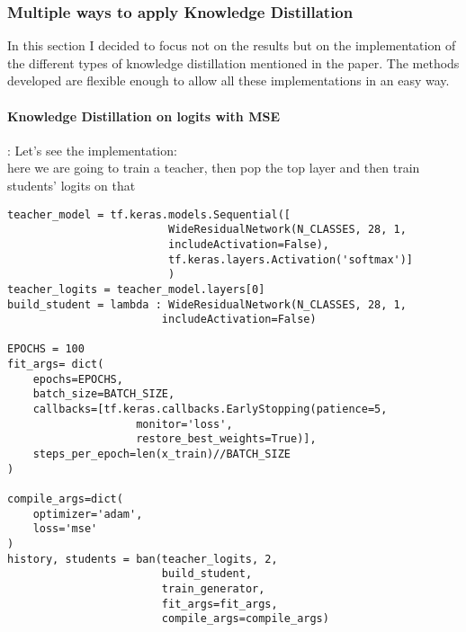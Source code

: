 \subsubsection{Multiple ways to apply Knowledge Distillation}
In this section I decided to focus not on the results but on the implementation of the different types of knowledge distillation mentioned in the paper\cite{kd}. The methods developed are flexible enough to allow all these implementations in an easy way.
\paragraph{Knowledge Distillation on logits with MSE}:
Let's see the implementation:\\
here we are going to train a teacher, then pop the top layer and then train students' logits on that
\lstset{language=Python}
\lstset{frame=lines}
\lstset{basicstyle=\footnotesize}
\begin{lstlisting}
teacher_model = tf.keras.models.Sequential([
                         WideResidualNetwork(N_CLASSES, 28, 1, 
                         includeActivation=False),
                         tf.keras.layers.Activation('softmax')]
                         )
teacher_logits = teacher_model.layers[0]
build_student = lambda : WideResidualNetwork(N_CLASSES, 28, 1, 
						includeActivation=False)
						
EPOCHS = 100
fit_args= dict(
    epochs=EPOCHS,
    batch_size=BATCH_SIZE,
    callbacks=[tf.keras.callbacks.EarlyStopping(patience=5, 
    				monitor='loss', 
    				restore_best_weights=True)],
    steps_per_epoch=len(x_train)//BATCH_SIZE
)

compile_args=dict(
    optimizer='adam',
    loss='mse'
)
history, students = ban(teacher_logits, 2, 
						build_student, 
						train_generator, 
						fit_args=fit_args, 
						compile_args=compile_args)
\end{lstlisting}

